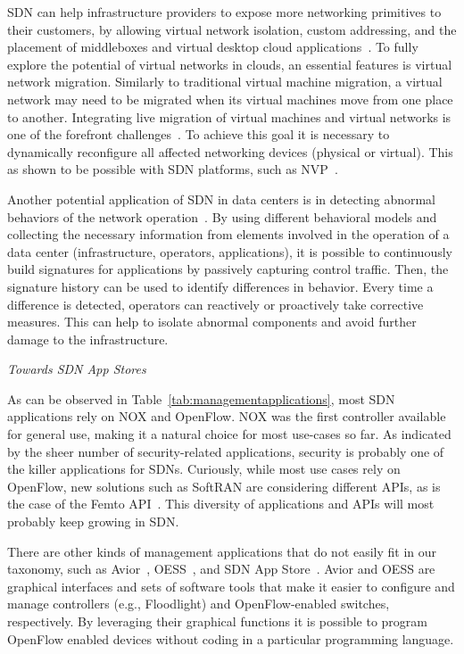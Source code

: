 SDN can help infrastructure providers to expose more networking primitives to their customers, by allowing virtual network isolation, custom addressing, and the placement of middleboxes and virtual desktop cloud applications~\cite{benson2011,calyam2013}. 
To fully explore the potential of virtual networks in clouds, an essential features is virtual network migration. 
Similarly to traditional virtual machine migration, a virtual network may need to be migrated when its virtual machines move from one place to another. Integrating live migration of virtual 
machines and virtual networks is one of the forefront challenges~\cite{keller2012}.
To achieve this goal it is necessary to dynamically reconfigure all affected networking devices (physical or 
virtual).
This as shown to be possible with SDN platforms, such as NVP~\cite{koponen}.

Another potential application of SDN in data centers is in detecting abnormal behaviors of the network 
operation~\cite{arefin2013}. By using different behavioral models and collecting the necessary 
information from elements involved in the operation of a data center (infrastructure, operators, applications), 
it is possible to continuously build signatures for applications by passively capturing control traffic.
Then, the signature history can be used to identify differences in behavior.
Every time a difference is detected, operators can reactively or proactively take corrective measures.
This can help to isolate abnormal components and avoid further damage to the
infrastructure.

\vspace{2mm}
\noindent \textit{Towards SDN App Stores}

As can be observed in Table~\ref{tab:managementapplications}, most SDN applications rely on NOX and OpenFlow.
NOX was the first controller available for general use, making it a natural choice for most use-cases so far.
As indicated by the sheer number of security-related applications, security is probably one of the killer 
applications for SDNs. Curiously, while most use cases rely on OpenFlow, new solutions such as SoftRAN are 
considering different APIs, as is the case of the Femto API~\cite{smallcellforum2013,Chandrasekhar2008}. This diversity of 
applications and APIs will most probably keep growing in SDN.

There are other kinds of management applications that do not easily fit in our taxonomy, such as Avior~\cite{parraga2013}, OESS~\cite{globalnoc2013}, and SDN App Store~\cite{duckett2013,hp2013-2}.
Avior and OESS are graphical interfaces and sets of software tools that make it easier to configure and manage controllers (e.g., Floodlight) and OpenFlow-enabled switches, respectively.
By leveraging their graphical functions it is possible to program OpenFlow enabled devices without coding in a particular programming language.

